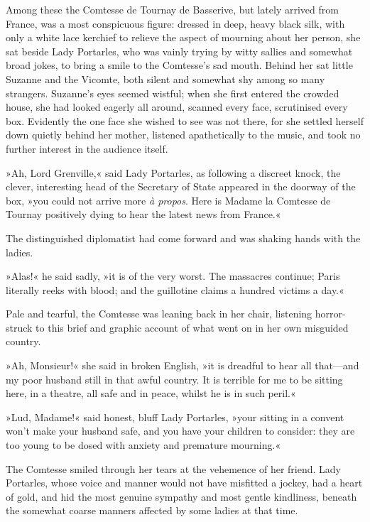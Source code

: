 Among these the Comtesse de Tournay de Basserive, but lately arrived from France, was a most conspicuous figure: dressed in deep, heavy black silk, with only a white lace kerchief to relieve the aspect of mourning about her person, she sat beside Lady Portarles, who was vainly trying by witty sallies and somewhat broad jokes, to bring a smile to the Comtesse's sad mouth. Behind her sat little Suzanne and the Vicomte, both silent and somewhat shy among so many strangers. Suzanne's eyes seemed wistful; when she first entered the crowded house, she had looked eagerly all around, scanned every face, scrutinised every box. Evidently the one face she wished to see was not there, for she settled herself down quietly behind her mother, listened apathetically to the music, and took no further interest in the audience itself.

»Ah, Lord Grenville,« said Lady Portarles, as following a discreet knock, the clever, interesting head of the Secretary of State appeared in the doorway of the box, »you could not arrive more \textit{à propos}. Here is Madame la Comtesse de Tournay positively dying to hear the latest news from France.«

The distinguished diplomatist had come forward and was shaking hands with the ladies.

»Alas!« he said sadly, »it is of the very worst. The massacres continue; Paris literally reeks with blood; and the guillotine claims a hundred victims a day.«

Pale and tearful, the Comtesse was leaning back in her chair, listening horror-struck to this brief and graphic account of what went on in her own misguided country.

»Ah, Monsieur!« she said in broken English, »it is dreadful to hear all that\allowbreak---\allowbreak and my poor husband still in that awful country. It is terrible for me to be sitting here, in a theatre, all safe and in peace, whilst he is in such peril.«

»Lud, Madame!« said honest, bluff Lady Portarles, »your sitting in a convent won't make your husband safe, and you have your children to consider: they are too young to be dosed with anxiety and premature mourning.«

The Comtesse smiled through her tears at the vehemence of her friend. Lady Portarles, whose voice and manner would not have misfitted a jockey, had a heart of gold, and hid the most genuine sympathy and most gentle kindliness, beneath the somewhat coarse manners affected by some ladies at that time.

